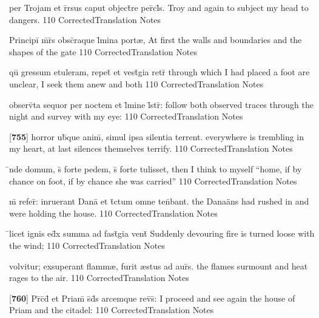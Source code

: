 \latline
  {per Trojam et r\={}rsus caput object\={}re per\={\macron {\i}}cl\={\macron {\i}}s.}
  { Troy and again to subject my head to dangers.   }
  {110}
  { CorrectedTranslation }
  { Notes }


\latline
  {Principi\={} m\={}r\={}s obsc\={}raque l\={\macron {\i}}mina port{\ae},}
  { At first the walls and boundaries and the shapes of the gate }
  {110}
  { CorrectedTranslation }
  { Notes }


\latline
  {qu\={} gressum etuleram, repet\={} et vest\={\macron {\i}}gia retr\={}}
  { through which I had placed a foot are unclear, I seek them anew and both  }
  {110}
  { CorrectedTranslation }
  { Notes }


\latline
  {observ\={}ta sequor per noctem et l\={}mine l\={}str\={}:}
  { follow both observed traces through the night and survey with my eye:  }
  {110}
  { CorrectedTranslation }
  { Notes }


\latline
  {[\textbf{755}] horror ub\={\macron {\i}}que anim\={}, simul ipsa silentia terrent.}
  { everywhere is trembling in my heart, at last silences themselves terrify. }
  {110}
  { CorrectedTranslation }
  { Notes }


\latline
  {\={}nde domum, s\={\macron {\i}} forte pedem, s\={\macron {\i}} forte tulisset,}
  { then I think to myself ``home, if by chance on foot, if by chance she was carried'' }
  {110}
  { CorrectedTranslation }
  { Notes }


\latline
  {m\={} refer\={}: inruerant Dana\={\macron {\i}} et t\={}ctum omne ten\={}bant.}
  { the Dana\"ans had rushed in and were holding the house. }
  {110}
  { CorrectedTranslation }
  { Notes }


\latline
  {\={}licet ignis ed\={}x summa ad fast\={\macron {\i}}gia vent\={}}
  { Suddenly devouring fire is turned loose with the wind; }
  {110}
  { CorrectedTranslation }
  { Notes }


\latline
  {volvitur; exsuperant flamm{\ae}, furit {\ae}stus ad aur\={}s.}
  { the flames surmount and heat rages to the air. }
  {110}
  { CorrectedTranslation }
  { Notes }


\latline
  {[\textbf{760}] Pr\={}c\={}d\={} et Priam\={\macron {\i}} s\={}d\={}s arcemque rev\={\macron {\i}}s\={}:}
  { I proceed and see again the house of Priam and the citadel: }
  {110}
  { CorrectedTranslation }
  { Notes }


